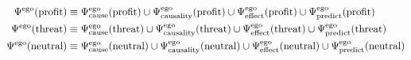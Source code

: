 \begin{align}
    \Psi^{\mathrm{ego}}(\mathrm{profit})  &\equiv \Psi^{\mathrm{ego}}_{\mathrm{cause}}(\mathrm{profit}) \cup \Psi^{\mathrm{ego}}_{\mathrm{causality}}(\mathrm{profit}) \cup \Psi^{\mathrm{ego}}_{\mathrm{effect}}(\mathrm{profit}) \cup \Psi^{\mathrm{ego}}_{\mathrm{predict}}(\mathrm{profit}) \\
    \Psi^{\mathrm{ego}}(\mathrm{threat})  &\equiv \Psi^{\mathrm{ego}}_{\mathrm{cause}}(\mathrm{threat}) \cup \Psi^{\mathrm{ego}}_{\mathrm{causality}}(\mathrm{threat}) \cup \Psi^{\mathrm{ego}}_{\mathrm{effect}}(\mathrm{threat}) \cup \Psi^{\mathrm{ego}}_{\mathrm{predict}}(\mathrm{threat}) \\
    \Psi^{\mathrm{ego}}(\mathrm{neutral}) &\equiv \Psi^{\mathrm{ego}}_{\mathrm{cause}}(\mathrm{neutral}) \cup \Psi^{\mathrm{ego}}_{\mathrm{causality}}(\mathrm{neutral}) \cup \Psi^{\mathrm{ego}}_{\mathrm{effect}}(\mathrm{neutral}) \cup \Psi^{\mathrm{ego}}_{\mathrm{predict}}(\mathrm{neutral})
\end{align}


